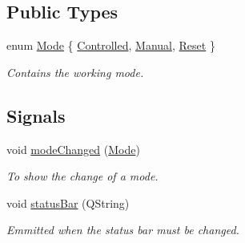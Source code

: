 \subsection*{Public Types}
\begin{DoxyCompactItemize}
\item 
enum \hyperlink{a00009_a8d581034e60792a9995d44065f6140a5}{Mode} \{ \hyperlink{a00009_a8d581034e60792a9995d44065f6140a5a7473f982355e53004aa4ec48482e0390}{Controlled}, 
\hyperlink{a00009_a8d581034e60792a9995d44065f6140a5ab07aa520bedb6453a76f5f05207bfc2c}{Manual}, 
\hyperlink{a00009_a8d581034e60792a9995d44065f6140a5aa4bd68ae9816441348750401b067bdf2}{Reset}
 \}
\begin{DoxyCompactList}\small\item\em Contains the working mode. \end{DoxyCompactList}\end{DoxyCompactItemize}
\subsection*{Signals}
\begin{DoxyCompactItemize}
\item 
void \hyperlink{a00009_a907b3805d113d09a945eb8f8d87851a7}{mode\+Changed} (\hyperlink{a00009_a8d581034e60792a9995d44065f6140a5}{Mode})
\begin{DoxyCompactList}\small\item\em To show the change of a mode. \end{DoxyCompactList}\item 
void \hyperlink{a00009_a3c84cf179d1746091795c60f3a68ce06}{status\+Bar} (Q\+String)
\begin{DoxyCompactList}\small\item\em Emmitted when the status bar must be changed. \end{DoxyCompactList}\end{DoxyCompactItemize}
